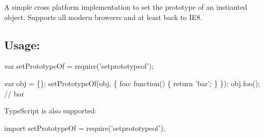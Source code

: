 A simple cross platform implementation to set the prototype of an instianted object. Supports all modern browsers and at least back to I\+E8.

\subsection*{Usage\+:}





\begin{DoxyCode}
var setPrototypeOf = require('setprototypeof');

var obj = \{\};
setPrototypeOf(obj, \{
  foo: function() \{
    return 'bar';
  \}
\});
obj.foo(); // bar
\end{DoxyCode}


Type\+Script is also supported\+: 
\begin{DoxyCode}
import setPrototypeOf = require('setprototypeof');
\end{DoxyCode}
 